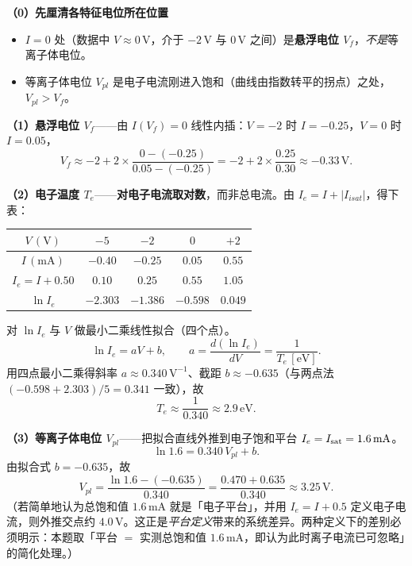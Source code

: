 \textbf{（0）先厘清各特征电位所在位置}
\begin{itemize}
    \item $I=0$ 处（数据中 $V\approx0\,\mathrm{V}$，介于 $-2\,\mathrm{V}$ 与 $0\,\mathrm{V}$ 之间）是\textbf{悬浮电位 $V_f$}，\emph{不是}等离子体电位。
    \item 等离子体电位 $V_{pl}$ 是电子电流刚进入饱和（曲线由指数转平的拐点）之处，$V_{pl} > V_f$。
\end{itemize}

\textbf{（1）悬浮电位 $V_f$}——由 $I(V_f)=0$ 线性内插：$V=-2$ 时 $I=-0.25$，$V=0$ 时 $I=0.05$，
\[
    V_f \approx -2 + 2\times\frac{0-(-0.25)}{0.05-(-0.25)} = -2 + 2\times\frac{0.25}{0.30} \approx -0.33\,\mathrm{V}.
\]

\textbf{（2）电子温度 $T_e$}——\textbf{对电子电流取对数}，而非总电流。由 $I_e = I + |I_{isat}|$，得下表：
\begin{center}
\begin{tabular}{c|cccc}
$V\,(\mathrm{V})$ & $-5$ & $-2$ & $0$ & $+2$ \\
\hline
$I\,(\mathrm{mA})$ & $-0.40$ & $-0.25$ & $0.05$ & $0.55$ \\
$I_e = I+0.50$ & $0.10$ & $0.25$ & $0.55$ & $1.05$ \\
$\ln I_e$ & $-2.303$ & $-1.386$ & $-0.598$ & $0.049$ \\
\end{tabular}
\end{center}
对 $\ln I_e$ 与 $V$ 做最小二乘线性拟合（四个点）。
\begin{equation}
    \ln I_e = aV + b,\qquad
    a = \frac{d(\ln I_e)}{dV} = \frac{1}{T_e\,[\mathrm{eV}]}.
\end{equation}
用四点最小二乘得斜率 $a\approx0.340\,\mathrm{V^{-1}}$、截距 $b\approx-0.635$（与两点法 $(-0.598+2.303)/5=0.341$ 一致），故
\[
    \boxed{T_e \approx \frac{1}{0.340} \approx 2.9\,\mathrm{eV}}.
\]

\textbf{（3）等离子体电位 $V_{pl}$}——把拟合直线外推到电子饱和平台 $I_e = I_{\rm sat} = 1.6\,\mathrm{mA}$。
\[
    \ln 1.6 = 0.340\,V_{pl} + b.
\]
由拟合式 $b = -0.635$，故
\[
    V_{pl} = \frac{\ln 1.6 - (-0.635)}{0.340} = \frac{0.470+0.635}{0.340} \approx 3.25\,\mathrm{V}.
\]
（若简单地认为总饱和值 $1.6\,\mathrm{mA}$ 就是「电子平台」，并用 $I_e = I + 0.5$ 定义电子电流，则外推交点约 $4.0\,\mathrm{V}$。这正是\emph{平台定义}带来的系统差异。两种定义下的差别必须明示：本题取「平台 $=$ 实测总饱和值 $1.6\,\mathrm{mA}$，即认为此时离子电流已可忽略」的简化处理。）

